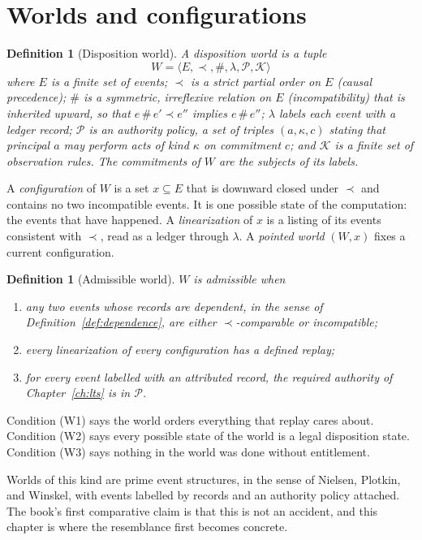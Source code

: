 \documentclass[11pt,openany]{book}
\newtheorem{definition}[theorem]{Definition}
\theoremstyle{remark}
\begin{document}
\section{Worlds and configurations}

\begin{definition}[Disposition world]
A \emph{disposition world} is a tuple
\[
W=\langle E,\prec,\#,\lambda,\mathcal P,\mathcal K\rangle
\]
where $E$ is a finite set of events; $\prec$ is a strict partial order on
$E$ (causal precedence); $\#$ is a symmetric, irreflexive relation on $E$
(incompatibility) that is inherited upward, so that $e\,\#\,e'\prec e''$
implies $e\,\#\,e''$; $\lambda$ labels each event with a ledger record;
$\mathcal P$ is an authority policy, a set of triples $(a,\kappa,c)$
stating that principal $a$ may perform acts of kind $\kappa$ on commitment
$c$; and $\mathcal K$ is a finite set of observation rules. The
commitments of $W$ are the subjects of its labels.
\end{definition}

A \emph{configuration} of $W$ is a set $x\subseteq E$ that is downward
closed under $\prec$ and contains no two incompatible events. It is one
possible state of the computation: the events that have happened. A
\emph{linearization} of $x$ is a listing of its events consistent with
$\prec$, read as a ledger through $\lambda$. A \emph{pointed world}
$(W,x)$ fixes a current configuration.

\begin{definition}[Admissible world]\label{def:admissible-world}
$W$ is \emph{admissible} when
\begin{enumerate}[label=(W\arabic*)]
\item any two events whose records are dependent, in the sense of
Definition~\ref{def:dependence}, are either $\prec$-comparable or
incompatible;
\item every linearization of every configuration has a defined replay;
\item for every event labelled with an attributed record, the required
authority of Chapter~\ref{ch:lts} is in $\mathcal P$.
\end{enumerate}
\end{definition}

Condition (W1) says the world orders everything that replay cares about.
Condition (W2) says every possible state of the world is a legal
disposition state. Condition (W3) says nothing in the world was done
without entitlement.

Worlds of this kind are prime event structures, in the sense of Nielsen,
Plotkin, and Winskel, with events labelled by records and an authority
policy attached. The book's first comparative claim is that this is not an
accident, and this chapter is where the resemblance first becomes
concrete.
\end{document}
